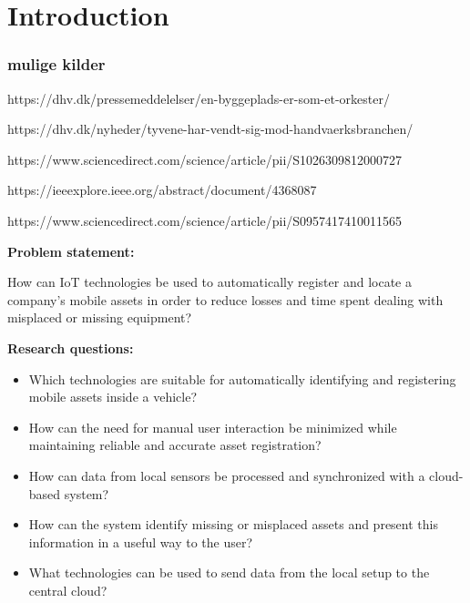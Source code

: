 \section{Introduction}
\subsubsection{mulige kilder}
https://dhv.dk/pressemeddelelser/en-byggeplads-er-som-et-orkester/

https://dhv.dk/nyheder/tyvene-har-vendt-sig-mod-handvaerksbranchen/

https://www.sciencedirect.com/science/article/pii/S1026309812000727

https://ieeexplore.ieee.org/abstract/document/4368087

https://www.sciencedirect.com/science/article/pii/S0957417410011565

\textbf{Problem statement:}

How can IoT technologies be used to automatically register and locate a company's mobile assets in order to reduce losses and time spent dealing with misplaced or missing equipment?

\textbf{Research questions:}
\begin{itemize}
    \item  Which technologies are suitable for automatically identifying and registering mobile assets inside a vehicle?
    \item How can the need for manual user interaction be minimized while maintaining reliable and accurate asset registration?
    \item How can data from local sensors be processed and synchronized with a cloud-based system?
    \item How can the system identify missing or misplaced assets and present this information in a useful way to the user?
    \item What technologies can be used to send data from the local setup to the central cloud?
\end{itemize}